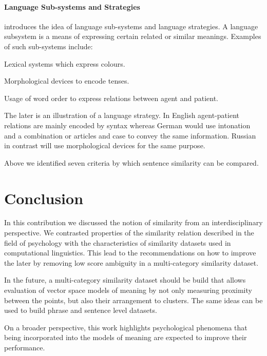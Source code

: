 \documentclass[11pt]{article}
\begin{document}
\paragraph{Language Sub-systems and Strategies}

 introduces the idea of language sub-systems and language strategies. A language subsystem is a means of expressing certain related or similar meanings. Examples of such sub-systems include:
\begin{compactitem}
    \item Lexical systems which express colours.
    \item Morphological devices to encode tenses.
    \item Usage of word order to express relations between agent and patient.
\end{compactitem}  
The later is an illustration of a language strategy. In English agent-patient relations are mainly encoded by syntax whereas German would use intonation and a combination or articles and case to convey the same information. Russian in contrast will use morphological devices for the same purpose. 

Above we identified seven criteria by which sentence similarity can be compared.

\section{Conclusion}

In this contribution we discussed the notion of similarity from an interdisciplinary perspective. We contrasted properties of the similarity relation described in the field of psychology with the characteristics of similarity datasets used in computational linguistics. This lead to the recommendations on how to improve the later by removing low score ambiguity in a multi-category similarity dataset.

In the future, a multi-category similarity dataset should be build that allows evaluation of vector space models of meaning by not only measuring proximity between the points, but also their arrangement to clusters. The same ideas can be used to build phrase and sentence level datasets.


On a broader perspective, this work highlights psychological phenomena that being incorporated into the models of meaning are expected to improve their performance.

\balance


\end{document}
